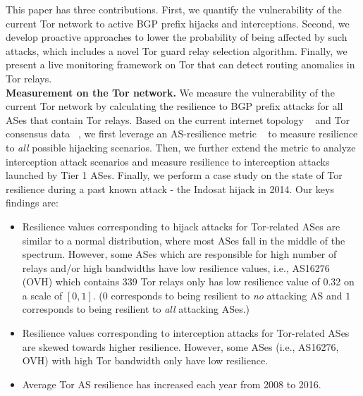 This paper has three contributions. First, we quantify the vulnerability of the current Tor network to active BGP prefix hijacks and interceptions. Second, we develop proactive approaches to lower the probability of being affected by such attacks, which includes a novel Tor guard relay selection algorithm. Finally, we present a live monitoring framework on Tor that can detect routing anomalies in Tor relays. 
\\
\textbf{Measurement on the Tor network.} We measure the vulnerability of the current Tor network by calculating the resilience to BGP prefix attacks for all ASes that contain Tor relays. Based on the current internet topology ~\cite{topology} and Tor consensus data ~\cite{torconsensus}, we first leverage an AS-resilience metric ~\cite{lad2007understanding} to measure resilience to \emph{all} possible hijacking scenarios. Then, we further extend the metric to analyze interception attack scenarios and measure resilience to interception attacks launched by Tier 1 ASes. Finally, we perform a case study on the state of Tor resilience during a past known attack - the Indosat hijack in 2014. Our keys findings are:
\begin{itemize}
\item Resilience values corresponding to hijack attacks for Tor-related ASes are similar to a normal distribution, where most ASes fall in the middle of the spectrum. However, some ASes which are responsible for high number of relays and/or high bandwidths have low resilience values, i.e., AS16276 (OVH) which contains 339 Tor relays only has low resilience value of 0.32 on a scale of $[0,1]$. ($0$ corresponds to being resilient to \emph{no} attacking AS and $1$ corresponds to being resilient to \emph{all} attacking ASes.)
\item Resilience values corresponding to interception attacks for Tor-related ASes are skewed towards higher resilience. However, some ASes (i.e., AS16276, OVH) with high Tor bandwidth only have low resilience. 
\item Average Tor AS resilience has increased each year from 2008 to 2016. 
\end{itemize}
